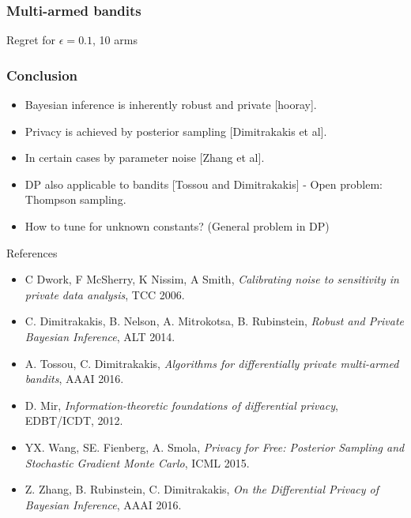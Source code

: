 \begin{frame}
  \frametitle{Multi-armed bandits}
  Regret for $\epsilon = 0.1$, 10 arms

  \scalebox{0.5}{}


\end{frame}

\begin{frame}
  \frametitle{Conclusion}
  \begin{itemize}
  \item Bayesian inference is inherently robust and private [hooray].
  \item Privacy is achieved by posterior sampling [Dimitrakakis et al].
  \item In certain cases by parameter noise [Zhang et al].
  \item DP also applicable to bandits [Tossou and Dimitrakakis] - Open problem: Thompson sampling.
  \item How to tune for unknown constants? (General problem in DP)
  \end{itemize}
  {\tiny
    \begin{block}{References}
      \begin{itemize}
      \item C Dwork, F McSherry, K Nissim, A Smith, \emph{Calibrating  noise to sensitivity in private data analysis}, TCC 2006.
      \item C. Dimitrakakis, B. Nelson, A. Mitrokotsa, B. Rubinstein, \emph{Robust and Private Bayesian Inference}, ALT 2014. 
      \item A. Tossou, C. Dimitrakakis, \emph{Algorithms for differentially private multi-armed bandits}, AAAI 2016.
      \item D. Mir, \emph{Information-theoretic foundations of
          differential privacy}, EDBT/ICDT, 2012.
      \item YX. Wang, SE. Fienberg, A. Smola, \emph{Privacy for Free: Posterior Sampling and Stochastic Gradient Monte Carlo}, ICML 2015.
      \item Z. Zhang, B. Rubinstein, C. Dimitrakakis, \emph{On the Differential Privacy of Bayesian Inference}, AAAI 2016.
      \end{itemize}
    \end{block}
  }
\end{frame}




